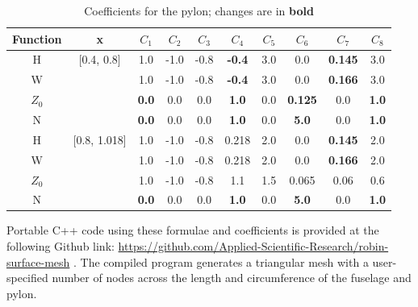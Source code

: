 \documentclass[journal]{new-aiaa}
\begin{document}
\begin{table}[ht]
\caption{Coefficients for the pylon; changes are in \textbf{bold}}
\centering
\begin{tabular}{cccccccccc}
Function & x & $C_{1}$ & $C_{2}$ & $C_{3}$ & $C_{4}$ & $C_{5}$ & $C_{6}$ & $C_{7}$ & $C_{8}$ \\
\hline
H          & [0.4, 0.8]  & 1.0             & -1.0 & -0.8 & \textbf{-0.4} & 3.0 & 0.0                  & \textbf{0.145} & 3.0 \\
W          &                 & 1.0             & -1.0 & -0.8 & \textbf{-0.4} & 3.0 & 0.0                  & \textbf{0.166} & 3.0 \\
$Z_{0}$ &                 & \textbf{0.0} & 0.0  & 0.0  & \textbf{1.0}  & 0.0  & \textbf{0.125} & 0.0                 & \textbf{1.0} \\
N           &                 & \textbf{0.0} & 0.0  & 0.0  & \textbf{1.0}  & 0.0  & \textbf{5.0}     & 0.0                 & \textbf{1.0} \\
\hline
H          & [0.8, 1.018]  & 1.0             & -1.0 & -0.8 & 0.218         & 2.0 & 0.0                 & \textbf{0.145} & 2.0 \\
W          &                     & 1.0             & -1.0 & -0.8 & 0.218         & 2.0 & 0.0                 & \textbf{0.166} & 2.0 \\
$Z_{0}$ &                     & 1.0             & -1.0 & -0.8 & 1.1             & 1.5 & 0.065             & 0.06               & 0.6 \\
N           &                     & \textbf{0.0} & 0.0  & 0.0  & \textbf{1.0} & 0.0 & \textbf{5.0}     & 0.0                 & \textbf{1.0} \\
\end{tabular}
\label{pycoeff}
\end{table}

Portable C++ code using these formulae and coefficients is provided at the following Github link:
\url{https://github.com/Applied-Scientific-Research/robin-surface-mesh} \cite{robinsurfmesh}.
The compiled program generates a triangular mesh with a user-specified number of nodes across
the length and circumference of the fuselage and pylon.

%

\end{document}
